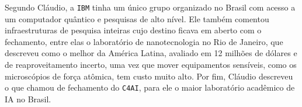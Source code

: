 Segundo Cláudio, a \texttt{IBM} tinha um único grupo organizado no Brasil com acesso a um computador quântico e pesquisas de alto nível. Ele também comentou infraestruturas de pesquisa inteiras cujo destino ficava em aberto com o fechamento, entre elas o laboratório de nanotecnologia no Rio de Janeiro, que descreveu como o melhor da América Latina, avaliado em 12 milhões de dólares e de reaproveitamento incerto, uma vez que mover equipamentos sensíveis, como os microscópios de força atômica, tem custo muito alto. Por fim, Cláudio descreveu o que chamou de fechamento do \texttt{C4AI}, para ele o maior laboratório acadêmico de IA no Brasil. %

